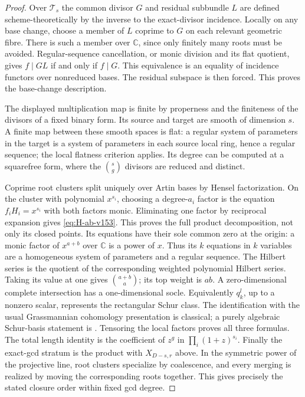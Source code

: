 \documentclass[11pt,reqno]{amsart}
\numberwithin{equation}{section}
\theoremstyle{definition}\newtheorem{definition}[theorem]{Definition}
\theoremstyle{remark}\newtheorem{remark}[theorem]{Remark}
\newcommand{\C}{\mathbb C}\newcommand{\Q}{\mathbb Q}
\begin{document}
\begin{proof}
Over $\mathcal T_s$ the common divisor $G$ and residual subbundle $L$
are defined scheme-theoretically by the inverse to the exact-divisor
incidence. Locally on any base change, choose a member of $L$ coprime
to $G$ on each relevant geometric fibre. There is such a member over
$\C$, since only finitely many roots must be avoided. Regular-sequence
cancellation, or monic division and its flat quotient, gives
$f\mid GL$ if and only if $f\mid G$. This equivalence is an equality
of incidence functors over nonreduced bases. The residual subspace is
then forced. This proves the base-change description.

The displayed multiplication map is finite by properness and the
finiteness of the divisors of a fixed binary form. Its source and
target are smooth of dimension $s$. A finite map between these smooth
spaces is flat: a regular system of parameters in the target is a
system of parameters in each source local ring, hence a regular
sequence; the local flatness criterion applies. Its degree can be
computed at a squarefree form, where the $\binom{s}{g}$ divisors are
reduced and distinct.

Coprime root clusters split uniquely over Artin bases by Hensel
factorization. On the cluster with polynomial $x^{s_i}$, choosing a
degree-$a_i$ factor is the equation $f_i H_i=x^{s_i}$ with both factors
monic. Eliminating one factor by reciprocal expansion gives
\eqref{eq:H-ab-v153}. This proves the full product decomposition,
not only its closed points. Its equations have their sole common zero
at the origin: a monic factor of $x^{a+b}$ over $\C$ is a power of
$x$. Thus its $k$ equations in $k$ variables are a homogeneous system
of parameters and a regular sequence. The Hilbert series is the
quotient of the corresponding weighted polynomial Hilbert series.
Taking its value at one gives $\binom{a+b}{a}$; its top weight is
$ab$. A zero-dimensional complete intersection has a one-dimensional
socle. Equivalently $q_k^l$, up to a nonzero scalar, represents the
rectangular Schur class. The identification with the usual
Grassmannian cohomology presentation is classical; a purely algebraic
Schur-basis statement is \cite[Theorem~2.7]{Grinberg2019}.
Tensoring the local factors proves all three formulas. The total
length identity is the coefficient of $z^g$ in
$\prod_i(1+z)^{s_i}$. Finally the exact-gcd stratum is the product
with $X_{D-s,r}$ above. In the symmetric power of the projective line,
root clusters specialize by coalescence, and every merging is realized
by moving the corresponding roots together. This gives precisely the
stated closure order within fixed gcd degree.
\end{proof}
\end{document}
